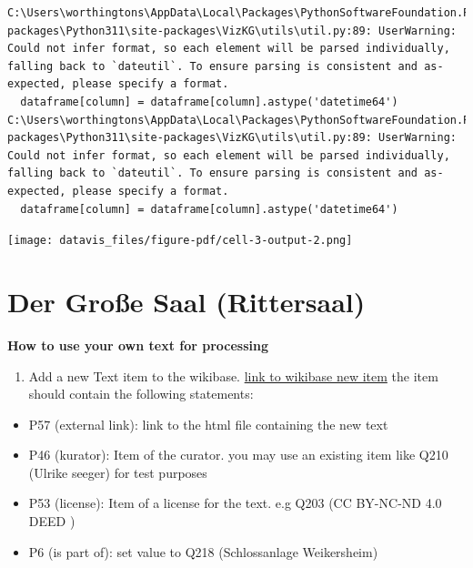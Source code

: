 \documentclass[
  letterpaper,
]{book}
\providecommand{\tightlist}{%
  \setlength{\itemsep}{0pt}\setlength{\parskip}{0pt}}\usepackage{longtable,booktabs,array}
\begin{document}
\begin{verbatim}
C:\Users\worthingtons\AppData\Local\Packages\PythonSoftwareFoundation.Python.3.11_qbz5n2kfra8p0\LocalCache\local-packages\Python311\site-packages\VizKG\utils\util.py:89: UserWarning: Could not infer format, so each element will be parsed individually, falling back to `dateutil`. To ensure parsing is consistent and as-expected, please specify a format.
  dataframe[column] = dataframe[column].astype('datetime64')
C:\Users\worthingtons\AppData\Local\Packages\PythonSoftwareFoundation.Python.3.11_qbz5n2kfra8p0\LocalCache\local-packages\Python311\site-packages\VizKG\utils\util.py:89: UserWarning: Could not infer format, so each element will be parsed individually, falling back to `dateutil`. To ensure parsing is consistent and as-expected, please specify a format.
  dataframe[column] = dataframe[column].astype('datetime64')
\end{verbatim}

\texttt{[image: datavis\_files/figure-pdf/cell-3-output-2.png]}


\chapter{Der Große Saal
(Rittersaal)}\label{der-grouxdfe-saal-rittersaal}

\textbf{How to use your own text for processing}

\begin{enumerate}
\def\labelenumi{\arabic{enumi}.}
\tightlist
\item
  Add a new Text item to the wikibase.
  \href{https://computational-publishing-service.wikibase.cloud/wiki/Special:NewItem}{link
  to wikibase new item} the item should contain the following
  statements:
\end{enumerate}

\begin{itemize}
\tightlist
\item
  P57 (external link): link to the html file containing the new text
\item
  P46 (kurator): Item of the curator. you may use an existing item like
  Q210 (Ulrike seeger) for test purposes
\item
  P53 (license): Item of a license for the text. e.g Q203 (CC BY-NC-ND
  4.0 DEED )
\item
  P6 (is part of): set value to Q218 (Schlossanlage Weikersheim)
\end{itemize}
\end{document}
